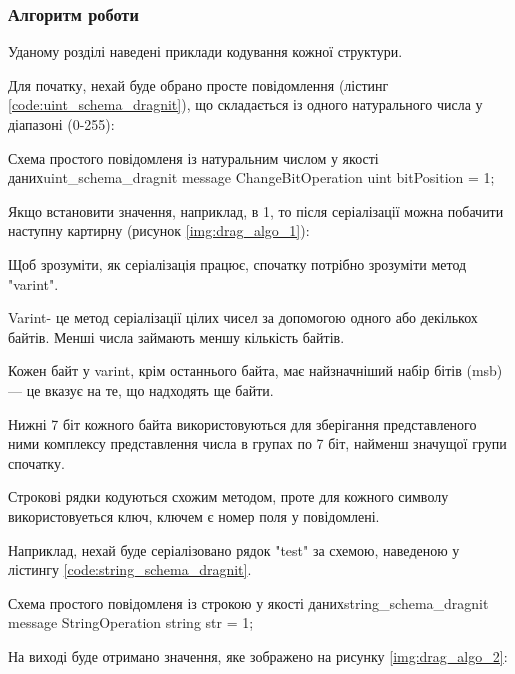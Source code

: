 \documentclass{lib/styles/default-style}
\begin{document}
    \subsubsection{Алгоритм роботи} 

    Уданому розділі наведені приклади кодування кожної структури.

    Для початку, нехай буде обрано просте повідомлення (лістинг \ref{code:uint_schema_dragnit}), що складається із одного натурального числа у діапазоні (0-255):

    \begin{stdout}{Схема простого повідомленя із натуральним числом у якості даних}{uint_schema_dragnit}
        message ChangeBitOperation {
            uint bitPosition = 1;
        }\end{stdout}
    
    Якщо встановити значення, наприклад, в 1, то
    після серіалізації можна побачити наступну картирну (рисунок \ref{img:drag_algo_1}):


    Щоб зрозуміти, як серіалізація працює, спочатку потрібно зрозуміти метод "varint".

    Varint- це метод серіалізації цілих чисел за допомогою одного або декількох байтів.
    Менші числа займають меншу кількість байтів.

    Кожен байт у varint, крім останнього байта, має найзначніший набір бітів (msb) --- це вказує на те,
    що надходять ще байти. 
    
    Нижні 7 біт кожного байта використовуються для зберігання представленого ними комплексу
    представлення числа в групах по 7 біт, найменш значущої групи спочатку.
    
    Строкові рядки кодуються схожим методом, проте для кожного символу використовуеться ключ, ключем є номер поля у повідомлені.

    Наприклад, нехай буде серіалізовано рядок "test" за схемою, наведеною у лістингу \ref{code:string_schema_dragnit}.

    \begin{stdout}{Схема простого повідомленя із строкою у якості даних}{string_schema_dragnit}
        message StringOperation {
            string str = 1;
        }\end{stdout}
    
    На виході буде отримано значення, яке зображено на рисунку \ref{img:drag_algo_2}:
\end{document}
